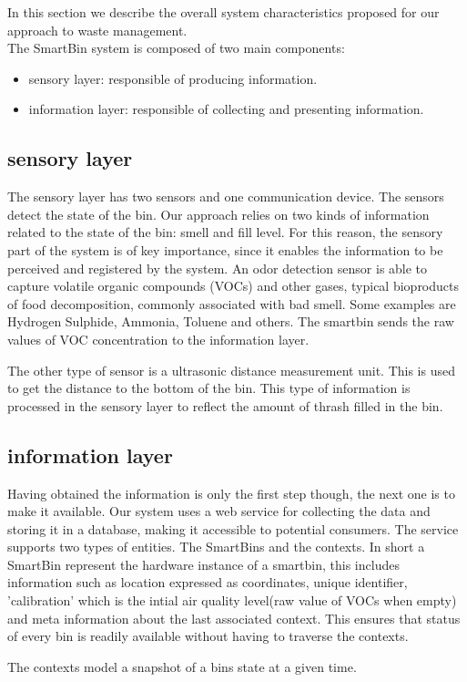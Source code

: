 In this section we describe the overall system characteristics proposed for our approach to waste management.\\
The SmartBin system is composed of two main components:
\begin{itemize}
\item sensory layer: responsible of producing information.
\item information layer: responsible of collecting and presenting information.
\end{itemize}

\subsection{sensory layer}
The sensory layer has two sensors and one communication device. The sensors detect the state of the bin.
Our approach relies on two kinds of information related to the state of the bin: smell and fill level.
For this reason, the sensory part of the system is of key importance, since it enables the information to be perceived and registered by the system.
An odor detection sensor is able to capture volatile organic compounds (VOCs) and other gases, typical bioproducts of food decomposition, commonly associated with bad smell. 
Some examples are Hydrogen Sulphide, Ammonia, Toluene and others.
The smartbin sends the raw values of VOC concentration to the information layer.

The other type of sensor is a ultrasonic distance measurement unit. This is used to get the distance to the bottom of the bin.
This type of information is processed in the sensory layer to reflect the amount of thrash filled in the bin.

\subsection{information layer}
Having obtained the information is only the first step though, the next one is to make it available.
Our system uses a web service for collecting the data and storing it in a database, making it accessible to potential consumers.
The service supports two types of entities. The SmartBins and the contexts.
In short a SmartBin represent the hardware instance of a smartbin, this includes information such as location expressed as coordinates, unique identifier, 'calibration' which is the intial air quality level(raw value of VOCs when empty) and meta information about the last associated context.
This ensures that status of every bin is readily available without having to traverse the contexts.

The contexts model a snapshot of a bins state at a given time.